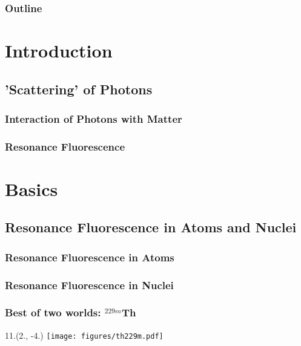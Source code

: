\documentclass{beamer}
\begin{document}
\begin{frame}
    \titlepage
\end{frame}

\begin{frame}
    \frametitle{Outline}
    \tableofcontents
\end{frame}

\section{Introduction}

\subsection{'Scattering' of Photons}

\begin{frame}
    \frametitle{Interaction of Photons with Matter}
    
\end{frame}

\begin{frame}
    \frametitle{Resonance Fluorescence}
    
\end{frame}

\section{Basics}

\subsection{Resonance Fluorescence in Atoms and Nuclei}

\begin{frame}
    \frametitle{Resonance Fluorescence in Atoms}
    
\end{frame}

\begin{frame}
    \frametitle{Resonance Fluorescence in Nuclei}
    
\end{frame}

\begin{frame}
    \frametitle{Best of two worlds: $^{229m}$Th}
    \begin{textblock}{11.}(2., -4.)
        \texttt{[image: figures/th229m.pdf]}
    \end{textblock}
\end{frame}
\end{document}
